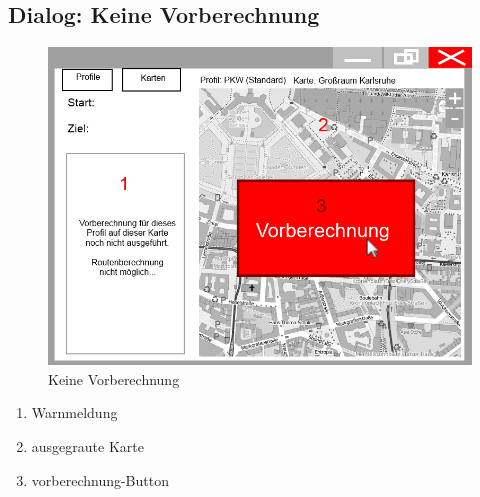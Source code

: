 \documentclass[a4paper, 11pt]{article}
\begin{document}
\subsection{Dialog: Keine Vorberechnung}
\begin{figure}[H]
\centering
\includegraphics[width=0.7\linewidth]{mockup_screenshot_nicht_berechnet}
\caption{Keine Vorberechnung}
\label{fig:mockupscreenshotkeinevorberechnung}
\end{figure}
\begin{enumerate}
\item Warnmeldung
\item ausgegraute Karte
\item \gls{vorberechnung}-Button
\end{enumerate}
\end{document}
